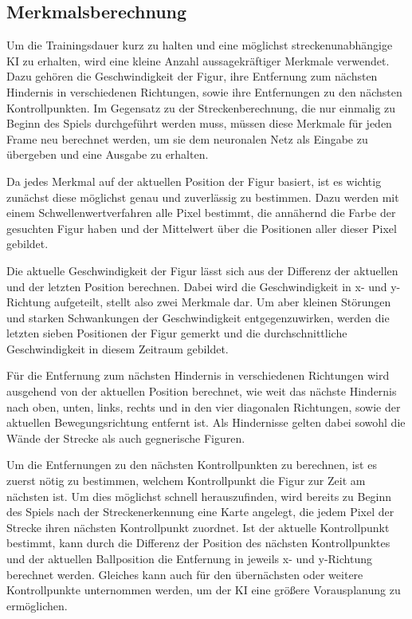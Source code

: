 \documentclass[11pt,final,journal,a4paper,towside,towcolumn]{IEEEtran}
\begin{document}
\subsection{Merkmalsberechnung}
Um die Trainingsdauer kurz zu halten und eine möglichst streckenunabhängige KI zu erhalten, wird eine kleine Anzahl aussagekräftiger Merkmale verwendet. Dazu gehören die Geschwindigkeit der Figur, ihre Entfernung zum nächsten Hindernis in verschiedenen Richtungen, sowie ihre Entfernungen zu den nächsten Kontrollpunkten. Im Gegensatz zu der Streckenberechnung, die nur einmalig zu Beginn des Spiels durchgeführt werden muss, müssen diese Merkmale für jeden Frame neu berechnet werden, um sie dem neuronalen Netz als Eingabe zu übergeben und eine Ausgabe zu erhalten.

Da jedes Merkmal auf der aktuellen Position der Figur basiert, ist es wichtig zunächst diese möglichst genau und zuverlässig zu bestimmen. Dazu werden mit einem Schwellenwertverfahren alle Pixel bestimmt, die annähernd die Farbe der gesuchten Figur haben und der Mittelwert über die Positionen aller dieser Pixel gebildet.

Die aktuelle Geschwindigkeit der Figur lässt sich aus der Differenz der aktuellen und der letzten Position berechnen. Dabei wird die Geschwindigkeit in x- und y-Richtung aufgeteilt, stellt also zwei Merkmale dar. Um aber kleinen Störungen und starken Schwankungen der Geschwindigkeit entgegenzuwirken, werden die letzten sieben Positionen der Figur gemerkt und die durchschnittliche Geschwindigkeit in diesem Zeitraum gebildet.

Für die Entfernung zum nächsten Hindernis in verschiedenen Richtungen wird ausgehend von der aktuellen Position berechnet, wie weit das nächste Hindernis nach oben, unten, links, rechts und in den vier diagonalen Richtungen, sowie der aktuellen Bewegungsrichtung entfernt ist. Als Hindernisse gelten dabei sowohl die Wände der Strecke als auch gegnerische Figuren.

Um die Entfernungen zu den nächsten Kontrollpunkten zu berechnen, ist es zuerst nötig zu bestimmen, welchem Kontrollpunkt die Figur zur Zeit am nächsten ist. Um dies möglichst schnell herauszufinden, wird bereits zu Beginn des Spiels nach der Streckenerkennung eine Karte angelegt, die jedem Pixel der Strecke ihren nächsten Kontrollpunkt zuordnet. Ist der aktuelle Kontrollpunkt bestimmt, kann durch die Differenz der Position des nächsten Kontrollpunktes und der aktuellen Ballposition die Entfernung in jeweils x- und y-Richtung berechnet werden. Gleiches kann auch für den übernächsten oder weitere Kontrollpunkte unternommen werden, um der KI eine größere Vorausplanung zu ermöglichen.
\end{document}

